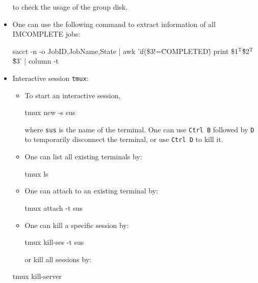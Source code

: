 \documentclass[UTF8]{book}
\newcommand{\code}[1]{\colorbox{codegray}{\texttt{#1}}}
\renewcommand{\t}{\ensuremath{^\mathrm{T}}}
\begin{document}
\begin{itemize}
\begin{bash}
\end{bash}
to check the usage of the group disk.
\item One can use the following command to extract information of all IMCOMPLETE jobs:
\begin{bash}
sacct -n -o JobID,JobName,State | awk '{if(\$3!=\"COMPLETED\") print \$1\"\t\"\$2\"\t\"\$3}' | column -t
\end{bash}
\item Interactive session \code{tmux}:
\begin{itemize}
	\item To start an interactive session,	
	\begin{bash}
tmux new -s sus
	\end{bash}
	where \code{sus} is the name of the terminal. One can use \code{Ctrl B} followed by \code{D} to temporarily disconnect the terminal, or use \code{Ctrl D} to kill it.
	\item One can list all existing terminals by:
	\begin{bash}
tmux ls
	\end{bash}
	\item One can attach to an existing terminal by:
	\begin{bash}
tmux attach -t sus
	\end{bash}
	\item One can kill a specific session by:
	\begin{bash}
tmux kill-ses -t sus
	\end{bash}
	or kill all sessions by:
\end{itemize}
	\begin{bash}
tmux kill-server
	\end{bash}
\end{itemize}
\end{document}
